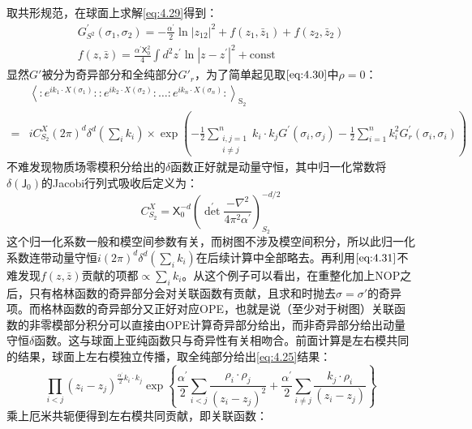 取共形规范，在球面上求解\ref{eq:4.29}得到：
\begin{equation}
\begin{gathered}
	\label{eq:4.31}
		G^{\prime}_{S^2}(\sigma_1,\sigma_2)=-\frac{\alpha^{\prime}}{2}\ln|z_{12}|^2+f(z_1,\bar{z}_1)+f(z_2,\bar{z}_2)\\
	f(z,\bar{z})=\frac{\alpha^{\prime}\mathsf{X}_0^2}{4}\int d^2z^{\prime}\ln|z-z^{\prime}|^2+\mathrm{const}
\end{gathered}
\end{equation}
显然$G'$被分为奇异部分和全纯部分$G'_r$，为了简单起见取$\ref{eq:4.30}$中$\rho = 0$：
\begin{equation}
	\label{eq:4.32}
\begin{aligned}
		&\left\langle:e^{ik_1\cdot X(\sigma_1)}::e^{ik_2\cdot X(\sigma_2)}:\ldots:e^{ik_n\cdot X(\sigma_n)}:\right\rangle_\mathrm{S_2}\\
	=&iC_{S_2}^X(2\pi)^d\delta^d(\sum_ik_i)\times\exp\left(-\frac12\sum_{\substack{i,j=1\\i\neq j}}^nk_i\cdot k_jG^{\prime}(\sigma_i,\sigma_j)-\frac{1}{2}\sum_{i=1}^nk_i^2G_r^{\prime}(\sigma_i,\sigma_i)\right)
\end{aligned}
\end{equation}
不难发现物质场零模积分给出的$\delta$函数正好就是动量守恒，其中归一化常数将$\delta(\mathsf{J}_0)$的Jacobi行列式吸收后定义为：
\begin{equation}
	C_{S_2}^X=\mathsf{X}_0^{-d}\left({\det}^{\prime}\frac{-\nabla^2}{4\pi^2\alpha^{\prime}}\right)_{S_2}^{-d/2}
\end{equation}
这个归一化系数一般和模空间参数有关，而树图不涉及模空间积分，所以此归一化系数连带动量守恒$i(2\pi)^d\delta^d(\sum_i k_i)$在后续计算中全部略去。再利用$\ref{eq:4.31}$不难发现$f(z,\bar z)$贡献的项都$\propto\sum_i k_i$。从这个例子可以看出，在重整化加上NOP之后，只有格林函数的奇异部分会对关联函数有贡献，且求和时抛去$\sigma=\sigma'$的奇异项。而格林函数的奇异部分又正好对应OPE，也就是说（至少对于树图）关联函数的非零模部分积分可以直接由OPE计算奇异部分给出，而非奇异部分给出动量守恒$\delta$函数。这与球面上亚纯函数只与奇异性有关相吻合。前面计算是左右模共同的结果，球面上左右模独立传播，取全纯部分给出\ref{eq:4.25}结果：
\begin{equation}
	\label{eq:4.34}
	\prod_{i<j}(z_i-z_j)^{\frac{\alpha^{\prime}}{2}k_i\cdot k_j}\exp\left\{\frac{\alpha^{\prime}}{2}\sum_{i<j}\frac{\rho_i\cdot\rho_j}{(z_i-z_j)^2}+\frac{\alpha^{\prime}}{2}\sum_{i\neq j}\frac{k_j\cdot\rho_i}{(z_i-z_j)}\right\}
\end{equation}
乘上厄米共轭便得到左右模共同贡献，即关联函数：
